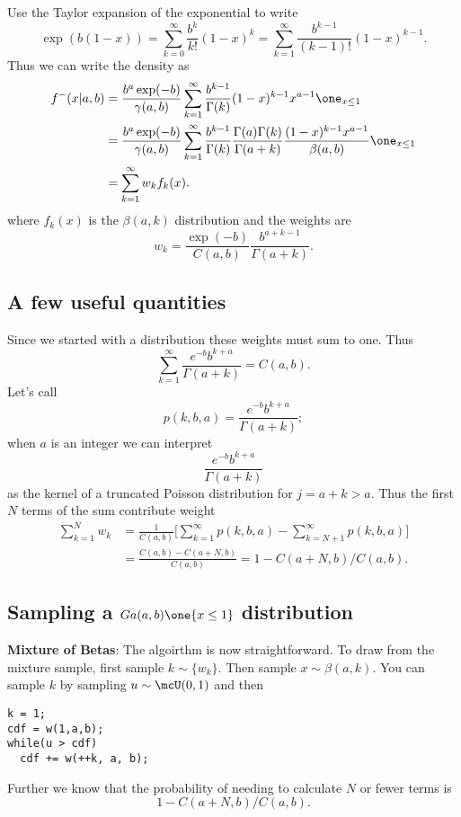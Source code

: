 \documentclass{article}
\begin{document}
Use the Taylor expansion of the exponential to write
\[
\exp(b(1-x)) 
= \sum_{k=0}^\infty \frac{b^k}{k!} (1-x)^k 
= \sum_{k=1}^\infty \frac{b^{k-1}}{(k-1)!} (1-x)^{k-1}. 
\]
Thus we can write the density as
\begin{align*}
f^-(x|a,b) 
& = \frac{b^a \exp(-b)}{\gamma(a,b)} 
\sum_{k=1}^\infty \frac{b^{k-1}}{\Gamma(k)} (1-x)^{k-1} x^{a-1} \one_{x \leq 1}
\\
& = \frac{b^a \exp(-b)}{\gamma(a,b)} 
\sum_{k=1}^\infty \frac{b^{k-1}}{\Gamma(k)} 
\frac{\Gamma(a) \Gamma(k)}{\Gamma(a+k)}
\frac{(1-x)^{k-1} x^{a-1}}{\beta(a,b)} \one_{x \leq 1} \\
& = \sum_{k=1}^\infty w_k f_k(x).
\end{align*}
where $f_k(x)$ is the $\beta(a,k)$ distribution and the weights are
\[
w_k = \frac{\exp(-b)}{C(a,b)} \frac{b^{a+k-1}}{\Gamma(a+k)}.
\]

\subsection{A few useful quantities}

Since we started with a distribution these weights must sum to one.  Thus
\[
\sum_{k=1}^\infty \frac{e^{-b} b^{k+a}}{\Gamma(a+k)} = C(a,b).
\]
Let's call
\[
p(k,b,a) = \frac{e^{-b} b^{k+a}}{\Gamma(a+k)};
\]
when $a$ is an integer we can interpret
\[
\frac{e^{-b} b^{k+a}}{\Gamma(a+k)}
\]
as the kernel of a truncated Poisson distribution for $j=a+k > a$.  Thus the
first $N$ terms of the sum contribute weight
\begin{align*}
\sum_{k=1}^N w_k 
& = \frac{1}{C(a,b)} 
\Big[ \sum_{k=1}^\infty p(k,b,a) - \sum_{k=N+1}^\infty p(k,b,a) \Big] \\
& = \frac{C(a,b) - C(a+N,b)}{C(a,b)} = 1 - C(a+N,b) / C(a, b).
\end{align*}

\subsection{Sampling a $Ga(a,b) \one \{x \leq 1\}$ distribution}

\textbf{Mixture of Betas}: The algoirthm is now straightforward.  To draw from
the mixture sample, first sample $k \sim \{w_k\}$.  Then sample $x \sim
\beta(a,k)$.  You can sample $k$ by sampling $u \sim \mcU(0,1)$ and then
\begin{verbatim}
k = 1;
cdf = w(1,a,b);
while(u > cdf)
  cdf += w(++k, a, b);
\end{verbatim}
Further we know that the probability of needing to calculate $N$ or fewer terms
is
\[
1 - C(a+N,b) / C(a,b).
\]
\end{document}
